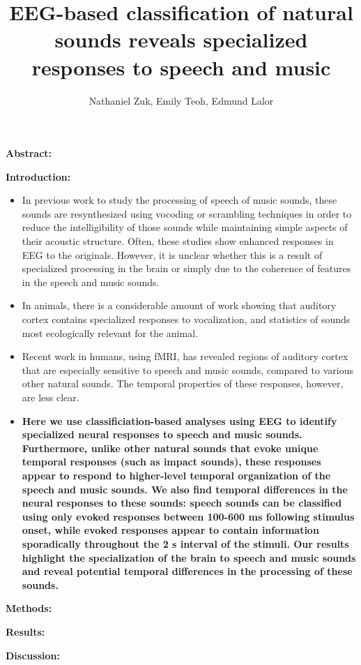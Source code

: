 \documentclass[11pt]{article}
\title{EEG-based classification of natural sounds reveals specialized responses to speech and music}
\author{Nathaniel Zuk, Emily Teoh, Edmund Lalor}
\begin{document}
\maketitle

\textbf{Abstract:}

\textbf{Introduction:}

\begin{itemize}
\item In previous work to study the processing of speech of music sounds, these sounds are resynthesized using vocoding or scrambling techniques in order to reduce the intelligibility of those sounds while maintaining simple aspects of their acoustic structure. Often, these studies show enhanced responses in EEG to the originals.  However, it is unclear whether this is a result of specialized processing in the brain or simply due to the coherence of features in the speech and music sounds.
\item In animals, there is a considerable amount of work showing that auditory cortex contains specialized responses to vocalization, and statistics of sounds most ecologically relevant for the animal.
\item Recent work in humans, using fMRI, has revealed regions of auditory cortex that are especially sensitive to speech and music sounds, compared to various other natural sounds.  The temporal properties of these responses, however, are less clear.
\item \textbf{Here we use classificiation-based analyses using EEG to identify specialized neural responses to speech and music sounds.  Furthermore, unlike other natural sounds that evoke unique temporal responses (such as impact sounds), these responses appear to respond to higher-level temporal organization of the speech and music sounds.  We also find temporal differences in the neural responses to these sounds: speech sounds can be classified using only evoked responses between 100-600 ms following stimulus onset, while evoked responses appear to contain information sporadically throughout the 2 s interval of the stimuli.  Our results highlight the specialization of the brain to speech and music sounds and reveal potential temporal differences in the processing of these sounds.}
\end{itemize}

\textbf{Methods:}

\textbf{Results:}

\textbf{Discussion:}
\end{document}
